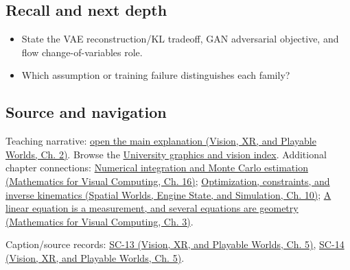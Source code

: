 \subsection{Recall and next depth}\label{appendix-2c568f05ee34-recall-and-next-depth}

\hypertarget{appendix-2c568f05ee34-recall-and-next-depth}{}

\begin{itemize}
\tightlist
\item
  State the VAE reconstruction/KL tradeoff, GAN adversarial objective, and flow change-of-variables role.
\item
  Which assumption or training failure distinguishes each family?
\end{itemize}

\subsection{Source and navigation}\label{appendix-2c568f05ee34-source-and-navigation}

\hypertarget{appendix-2c568f05ee34-source-and-navigation}{}

Teaching narrative: \href{../07-Vision-XR-and-Playable-Worlds/main.pdf\#nameddest=04-visual-computing-ii-ch031-generative-models-learn-distributions-and-samplers}{open the main explanation (Vision, XR, and Playable Worlds, Ch. 2)}. Browse the \hyperref[appendix-a6d556a4ef50-university-graphics-vision-and-photography---independent-series]{University graphics and vision index}. Additional chapter connections: \href{../02-Mathematics-for-Visual-Computing/main.pdf\#nameddest=03-visual-computing-i-ch012-numerical-integration-and-monte-carlo-estimation}{Numerical integration and Monte Carlo estimation (Mathematics for Visual Computing, Ch. 16)}; \href{../05-Spatial-Worlds-Engine-State-and-Simulation/main.pdf\#nameddest=04-visual-computing-ii-ch029-optimization-constraints-and-inverse-kinematics}{Optimization, constraints, and inverse kinematics (Spatial Worlds, Engine State, and Simulation, Ch. 10)}; \href{../02-Mathematics-for-Visual-Computing/main.pdf\#nameddest=01-foundations-i-ch019-a-linear-equation-is-a-measurement-and-several-equations-are-geometry}{A linear equation is a measurement, and several equations are geometry (Mathematics for Visual Computing, Ch. 3)}.

Caption/source records: \href{../07-Vision-XR-and-Playable-Worlds/main.pdf\#nameddest=04-visual-computing-ii-ch036-sc-13---stanford-cs231n-deep-learning-for-computer-vision-spring-2025-lecture-13-generative-models-1}{SC-13 (Vision, XR, and Playable Worlds, Ch. 5)}, \href{../07-Vision-XR-and-Playable-Worlds/main.pdf\#nameddest=04-visual-computing-ii-ch036-sc-14---stanford-cs231n-deep-learning-for-computer-vision-spring-2025-lecture-14-generative-models-2}{SC-14 (Vision, XR, and Playable Worlds, Ch. 5)}.
